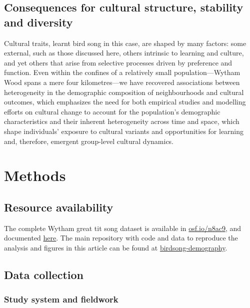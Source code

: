 \subsection{Consequences for cultural structure, stability and diversity}

Cultural traits, learnt bird song in this case, are shaped by many factors: some external, such as those discussed here, others intrinsic to learning and culture, and yet others that arise from selective processes driven by preference and function. Even within the confines of a relatively small population---Wytham Wood spans a mere four kilometres---we have recovered associations between heterogeneity in the demographic composition of neighbourhoods and cultural outcomes, which emphasizes the need for both empirical studies and modelling efforts on cultural change to account for the population's demographic characteristics and their inherent heterogeneity across time and space, which shape individuals’ exposure to cultural variants and opportunities for learning and, therefore, emergent group-level cultural dynamics.

\section{Methods}

\subsection{Resource availability}

The complete Wytham great tit song dataset is available in \href{https://osf.io/n8ac9}{osf.io/n8ac9}, and documented \href{https://nilomr.github.io/great-tit-hits/}{here}. The main repository with code and data to reproduce the analysis and figures in this article can be found at \href{http://github.com/nilomr/birdsong-demography}{birdsong-demography}.

\subsection{Data collection}

\subsubsection{Study system and fieldwork}

